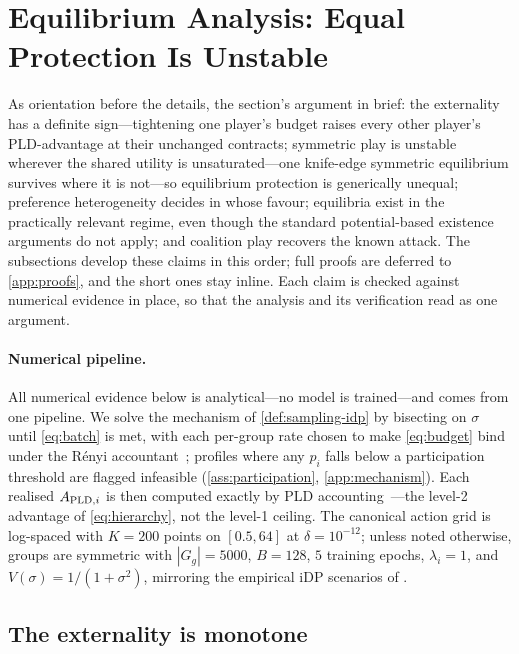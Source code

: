 \section{Equilibrium Analysis: Equal Protection Is Unstable}
\label{sec:analysis}

As orientation before the details, the section's argument in brief:
the externality has a definite sign---tightening one player's budget
raises every other player's \ac{PLD}-advantage at their unchanged
contracts; symmetric play is unstable wherever the shared utility
is unsaturated---one knife-edge symmetric equilibrium survives
where it is not---so equilibrium protection is generically unequal;
preference heterogeneity decides in whose favour; equilibria exist in the practically
relevant regime, even though the standard potential-based existence
arguments do not apply; and coalition play recovers the known
attack. The subsections develop these claims in this order; full
proofs are deferred to \cref{app:proofs}, and the short ones stay
inline. Each claim is checked against numerical evidence in place,
so that the analysis and its verification read as one argument.

\paragraph{Numerical pipeline.}\label{sec:setup} All numerical
evidence below is analytical---no model is trained---and comes
from one pipeline. We solve the mechanism of
\cref{def:sampling-idp} by bisecting on $\sigma$ until
\eqref{eq:batch} is met, with each per-group rate chosen to make
\eqref{eq:budget} bind under the R\'enyi
accountant~\cite{mironov2017renyi}; profiles where any $p_i$ falls
below a participation threshold are flagged infeasible
(\cref{ass:participation}, \cref{app:mechanism}). Each realised
$A_{\mathrm{PLD},i}$ is then computed exactly by \ac{PLD}
accounting~\cite{google-dp-accounting}---the level-2 advantage of
\eqref{eq:hierarchy}, not the level-1 ceiling. The canonical
action grid is log-spaced with $K = 200$ points on $[0.5, 64]$ at
$\delta = 10^{-12}$; unless noted otherwise, groups are symmetric
with $|G_g| = 5000$, $B = 128$, $5$ training epochs, $\lambda_i =
1$, and $V(\sigma) = 1/(1+\sigma^2)$, mirroring the empirical
\ac{iDP} scenarios of \citet{kaiser2026your, boenisch2023have}.

\subsection{The externality is monotone}

